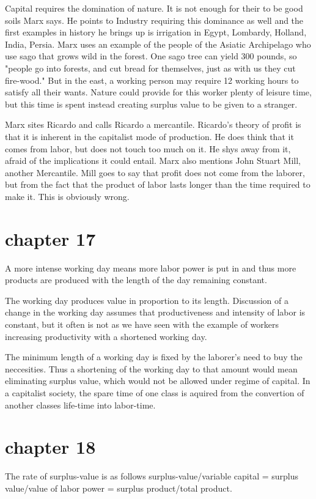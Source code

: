 \documentclass{article}
\begin{document}
Capital requires the domination of nature. It is not enough for their to be good soils Marx says. He points to Industry requiring this dominance as well and the first examples in history he brings up is irrigation in Egypt, Lombardy, Holland, India, Persia. Marx uses an example of the people of the Asiatic Archipelago who use sago that grows wild in the forest. One sago tree can yield 300 pounds, so "people go into forests, and cut bread for themselves, just as with us they cut fire-wood." But in the east, a working person may require 12 working hours to satisfy all their wants. Nature could provide for this worker plenty of leisure time, but this time is spent instead creating surplus value to be given to a stranger. 

Marx sites Ricardo and calls Ricardo a mercantile. Ricardo's theory of profit is that it is inherent in the capitalist mode of production. He does think that it comes from labor, but does not touch too much on it. He shys away from it, afraid of the implications it could entail. Marx also mentions John Stuart Mill, another Mercantile. Mill goes to say that profit does not come from the laborer, but from the fact that the product of labor lasts longer than the time required to make it. This is obviously wrong. 

\section{chapter 17}
A more intense working day means more labor power is put in and thus more products are produced with the length of the day remaining constant. 

The working day produces value in proportion to its length. Discussion of a change in the working day assumes that productiveness and intensity of labor is constant, but it often is not as we have seen with the example of workers increasing productivity with a shortened working day.

The minimum length of a working day is fixed by the laborer's need to buy the neccesities. Thus a shortening of the working day to that amount would mean eliminating surplus value, which would not be allowed under regime of capital. In a capitalist society, the spare time of one class is aquired from the convertion of another classes life-time into labor-time. 

\section{chapter 18}
The rate of surplus-value is as follows
surplus-value/variable capital = surplus value/value of labor power = surplus product/total product.
\end{document}
